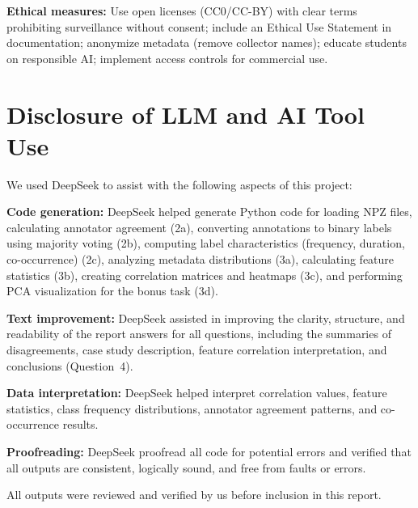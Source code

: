 \documentclass{article}
\begin{document}
\textbf{Ethical measures:} Use open licenses (CC0/CC-BY) with clear terms prohibiting surveillance without consent; include an Ethical Use Statement in documentation; anonymize metadata (remove collector names); educate students on responsible AI; implement access controls for commercial use.


\section{Disclosure of LLM and AI Tool Use}

We used DeepSeek to assist with the following aspects of this project:

\textbf{Code generation:} DeepSeek helped generate Python code for loading NPZ files, calculating annotator agreement (2a), converting annotations to binary labels using majority voting (2b), computing label characteristics (frequency, duration, co-occurrence) (2c), analyzing metadata distributions (3a), calculating feature statistics (3b), creating correlation matrices and heatmaps (3c), and performing PCA visualization for the bonus task (3d).

\textbf{Text improvement:} DeepSeek assisted in improving the clarity, structure, and readability of the report answers for all questions, including the summaries of disagreements, case study description, feature correlation interpretation, and conclusions (Question~4).

\textbf{Data interpretation:} DeepSeek helped interpret correlation values, feature statistics, class frequency distributions, annotator agreement patterns, and co-occurrence results.

\textbf{Proofreading:} DeepSeek proofread all code for potential errors and verified that all outputs are consistent, logically sound, and free from faults or errors.

All outputs were reviewed and verified by us before inclusion in this report.


\end{document}
